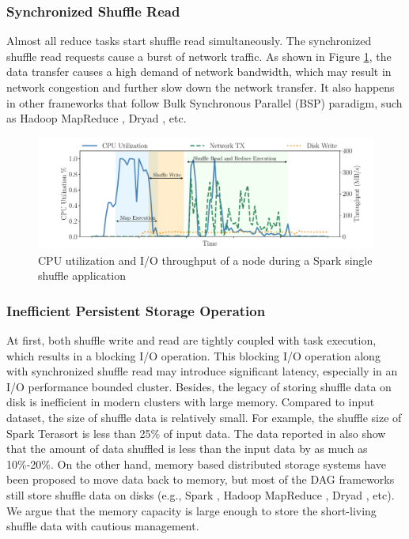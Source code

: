 \subsubsection{Synchronized Shuffle Read}
Almost all reduce tasks start shuffle read simultaneously. 
The synchronized shuffle read requests cause a burst of network traffic. 
As shown in Figure \ref{fig:util}, 
the data transfer causes a high demand of network bandwidth, which may result in network congestion and further slow down the network transfer.
It also happens in other frameworks that follow Bulk Synchronous Parallel (BSP) paradigm, such as Hadoop MapReduce \cite{hadoop}, Dryad \cite{dryad}, etc.

\begin{figure}
	\includegraphics[width=\linewidth]{fig/util}
	\caption{CPU utilization and I/O throughput of a node during a Spark single shuffle application}
	\label{fig:util}
	\vspace{-1em}
\end{figure}

\subsubsection{Inefficient Persistent Storage Operation}
At first, both shuffle write and read are tightly coupled with task execution, which results in a blocking I/O operation. 
This blocking I/O operation along with synchronized shuffle read may introduce significant latency, especially in an I/O performance bounded cluster.
Besides, the legacy of storing shuffle data on disk is inefficient in modern clusters with large memory. 
Compared to input dataset, the size of shuffle data is relatively small. 
For example, the shuffle size of Spark Terasort \cite{spark-tera} is less than 25\% of input data. 
The data reported in \cite{makingsense} also show that the amount of data shuffled is less than the input data by as much as 10\%-20\%. 
\ifrevision
{}
\fi
On the other hand, memory based distributed storage systems have been proposed \cite{memcached, tachyon, ramcloud} to move data back to memory, 
but most of the DAG frameworks still store shuffle data on disks (e.g., Spark \cite{apachespark}, Hadoop MapReduce \cite{hadoop}, Dryad \cite{dryad}, etc).
We argue that the memory capacity is large enough to store the short-living shuffle data with cautious management.

